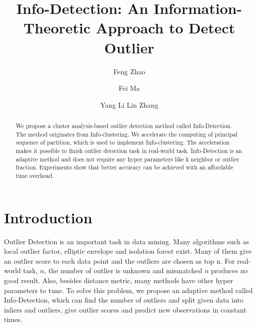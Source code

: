 \documentclass[runningheads]{llncs}
\begin{document}
%
\title{Info-Detection: An Information-Theoretic Approach to Detect Outlier}
%
%
\author{Feng Zhao \and
Fei Ma \and
Yang Li
Lin Zhang}
%
%
%
\maketitle              %
%
\begin{abstract}
We propose a cluster analysis-based outlier detection method called Info-Detection. The method originates from Info-clustering. We accelerate the computing of principal sequence of partition, which is used to implement Info-clustering. The acceleration makes it possible to finish outlier detection task in real-world task. Info-Detection is an adaptive method and does not require any hyper parameters like k neighbor or outlier fraction. Experiments show that better accuracy can be achieved with an affordable time overhead.

\end{abstract}
%
%
%
\section{Introduction}
Outlier Detection is an important task in data mining. Many algorithms such as local outlier factor, elliptic envelope and isolation forest\cite{if} exist. Many of them give an outlier score to each data point and the outliers are chosen as top n. For real-world task, $n$, the number of outlier is unknown and mismatched $n$ produces no good result. Also, besides distance metric, many methods have other hyper parameters to tune. To solve this problem, we propose an adaptive method called Info-Detection, which can find the number of outliers and split given data into inliers and outliers, give outlier scores and predict new observations in constant times.
 
\end{document}
